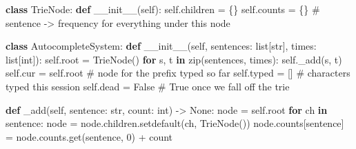 \documentclass[11pt]{article}
\newenvironment{Shaded}{\begin{snugshade}}{\end{snugshade}}
\newcommand{\BuiltInTok}[1]{\textcolor[rgb]{0.50,0.55,0.55}{#1}}
\newcommand{\CommentTok}[1]{\textcolor[rgb]{0.48,0.49,0.49}{#1}}
\newcommand{\ControlFlowTok}[1]{\textcolor[rgb]{0.99,0.74,0.29}{\textbf{#1}}}
\newcommand{\DecValTok}[1]{\textcolor[rgb]{0.96,0.45,0.00}{#1}}
\newcommand{\FunctionTok}[1]{\textcolor[rgb]{0.56,0.27,0.68}{#1}}
\newcommand{\KeywordTok}[1]{\textcolor[rgb]{0.81,0.81,0.76}{\textbf{#1}}}
\newcommand{\NormalTok}[1]{\textcolor[rgb]{0.81,0.81,0.76}{#1}}
\newcommand{\OperatorTok}[1]{\textcolor[rgb]{0.81,0.81,0.76}{#1}}
\newcommand{\VariableTok}[1]{\textcolor[rgb]{0.15,0.68,0.68}{#1}}
\begin{document}

\begin{Shaded}
\begin{Highlighting}[]
\KeywordTok{class}\NormalTok{ TrieNode:}
    \KeywordTok{def} \FunctionTok{\_\_init\_\_}\NormalTok{(}\VariableTok{self}\NormalTok{):}
        \VariableTok{self}\NormalTok{.children }\OperatorTok{=}\NormalTok{ \{\}}
        \VariableTok{self}\NormalTok{.counts }\OperatorTok{=}\NormalTok{ \{\}            }\CommentTok{\# sentence {-}\textgreater{} frequency for everything under this node}

\KeywordTok{class}\NormalTok{ AutocompleteSystem:}
    \KeywordTok{def} \FunctionTok{\_\_init\_\_}\NormalTok{(}\VariableTok{self}\NormalTok{, sentences: }\BuiltInTok{list}\NormalTok{[}\BuiltInTok{str}\NormalTok{], times: }\BuiltInTok{list}\NormalTok{[}\BuiltInTok{int}\NormalTok{]):}
        \VariableTok{self}\NormalTok{.root }\OperatorTok{=}\NormalTok{ TrieNode()}
        \ControlFlowTok{for}\NormalTok{ s, t }\KeywordTok{in} \BuiltInTok{zip}\NormalTok{(sentences, times):}
            \VariableTok{self}\NormalTok{.\_add(s, t)}
        \VariableTok{self}\NormalTok{.cur }\OperatorTok{=} \VariableTok{self}\NormalTok{.root        }\CommentTok{\# node for the prefix typed so far}
        \VariableTok{self}\NormalTok{.typed }\OperatorTok{=}\NormalTok{ []             }\CommentTok{\# characters typed this session}
        \VariableTok{self}\NormalTok{.dead }\OperatorTok{=} \VariableTok{False}           \CommentTok{\# True once we fall off the trie}

    \KeywordTok{def}\NormalTok{ \_add(}\VariableTok{self}\NormalTok{, sentence: }\BuiltInTok{str}\NormalTok{, count: }\BuiltInTok{int}\NormalTok{) }\OperatorTok{{-}\textgreater{}} \VariableTok{None}\NormalTok{:}
\NormalTok{        node }\OperatorTok{=} \VariableTok{self}\NormalTok{.root}
        \ControlFlowTok{for}\NormalTok{ ch }\KeywordTok{in}\NormalTok{ sentence:}
\NormalTok{            node }\OperatorTok{=}\NormalTok{ node.children.setdefault(ch, TrieNode())}
\NormalTok{            node.counts[sentence] }\OperatorTok{=}\NormalTok{ node.counts.get(sentence, }\DecValTok{0}\NormalTok{) }\OperatorTok{+}\NormalTok{ count}


\end{Highlighting}
\end{Shaded}
\end{document}
